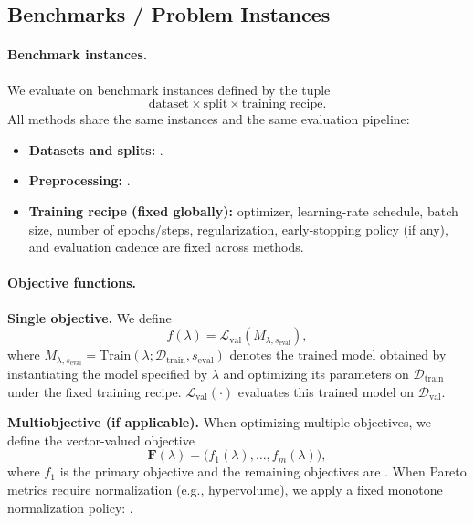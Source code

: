 \subsection{Benchmarks / Problem Instances}
\label{subsec:benchmarks}

\paragraph{Benchmark instances.}
We evaluate on benchmark instances defined by the tuple
\[
    \text{dataset} \times \text{split} \times \text{training recipe}.
\]
All methods share the same instances and the same evaluation pipeline:
\begin{itemize}
    \item \textbf{Datasets and splits:} \DatasetsSplits{}.
    \item \textbf{Preprocessing:} \PreprocessingDetails{}.
    \item \textbf{Training recipe (fixed globally):} optimizer, learning-rate schedule, batch size, number of epochs/steps,
    regularization, early-stopping policy (if any), and evaluation cadence are fixed across methods.
\end{itemize}

\paragraph{Objective functions.}
\textbf{Single objective.}
We define
\begin{equation}
    f(\lambda)
    = \mathcal{L}_{\mathrm{val}}\!\left(
        M_{\lambda, s_{\mathrm{eval}}}
      \right),
\end{equation}
where \(M_{\lambda, s_{\mathrm{eval}}} = \mathrm{Train}(\lambda; \mathcal{D}_{\mathrm{train}}, s_{\mathrm{eval}})\) denotes the trained model
obtained by instantiating the model specified by \(\lambda\) and optimizing its parameters on \(\mathcal{D}_{\mathrm{train}}\) under the fixed training recipe.
\(\mathcal{L}_{\mathrm{val}}(\cdot)\) evaluates this trained model on \(\mathcal{D}_{\mathrm{val}}\).

\textbf{Multiobjective (if applicable).}
When optimizing multiple objectives, we define the vector-valued objective
\begin{equation}
    \mathbf{F}(\lambda) = \big(f_1(\lambda), \ldots, f_m(\lambda)\big),
\end{equation}
where \(f_1\) is the primary objective \PrimaryObjective{} and the remaining objectives are \SecondaryObjectives{}.
When Pareto metrics require normalization (e.g., hypervolume), we apply a fixed monotone normalization policy:
\ObjectiveNormalizationPolicy{}.

